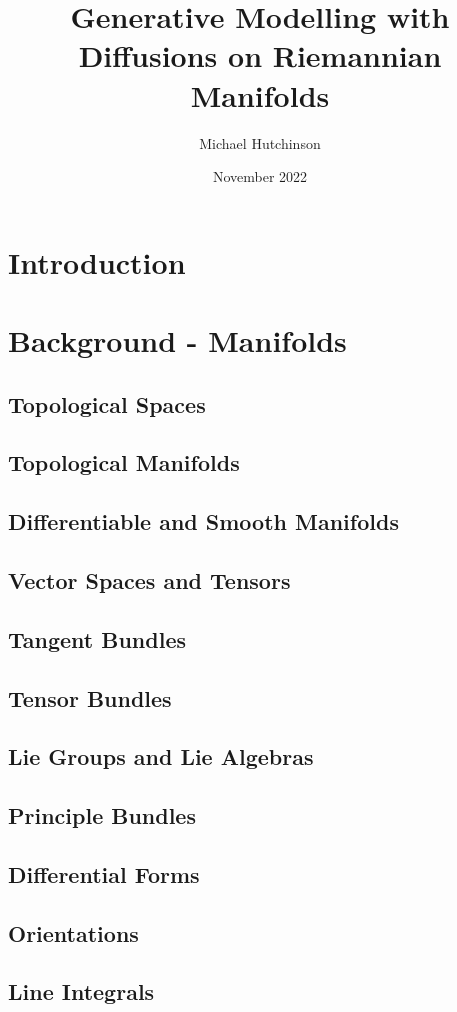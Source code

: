 \documentclass[10pt]{book}
\title{Generative Modelling with Diffusions on Riemannian Manifolds}
\author{Michael Hutchinson}
\date{November 2022}
\begin{document}
\tableofcontents 

\chapter{Introduction} \setcounter{page}{1}  


\chapter{Background - Manifolds}
\section{Topological Spaces}
\section{Topological Manifolds}
\section{Differentiable and Smooth Manifolds}
\section{Vector Spaces and Tensors}
\section{Tangent Bundles}
\section{Tensor Bundles}
\section{Lie Groups and Lie Algebras}
\section{Principle Bundles}
\section{Differential Forms}
\section{Orientations}
\section{Line Integrals}
\end{document}
